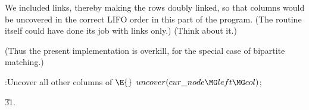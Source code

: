 We included  links, thereby making the
rows doubly linked, so
that columns would be uncovered in the correct LIFO order in this
part of the program. (The  routine itself could have done its
job with  links only.) (Think about it.)

(Thus the present implementation is overkill, for the special
case of bipartite matching.)

\Y\B\4:Uncover all other columns of \X${}\E{}$\6
$\\{uncover}(\\{cur\_node}\MG\\{left}\MG\\{col}){}$;\par
\U31.\fi

